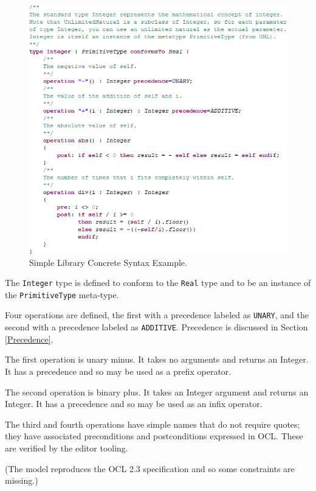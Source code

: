 \documentclass{eceasst}
\begin{document}
\begin{figure}
  \begin{center}
    \includegraphics[width=5.0in]{SimpleExample.png}
  \end{center}
  \caption{Simple Library Concrete Syntax Example.}
  \label{fig:SimpleExample}
\end{figure}

The \verb|Integer| type is defined to conform to the \verb|Real| type and to be an instance of the \verb|PrimitiveType| meta-type.

Four operations are defined, the first with a precedence labeled as \verb|UNARY|, and the second with a precedence labeled as \verb|ADDITIVE|. Precedence is discussed in Section \ref{Precedence}.

The first operation is unary minus. It takes no arguments and returns an Integer. It has a precedence and so may be used as a prefix operator.

The second operation is binary plus. It takes an Integer argument and returns an Integer. It has a precedence and so may be used as an infix operator.

The third and fourth operations have simple names that do not require quotes; they have associated preconditions and postconditions expressed in OCL. These are verified by the editor tooling.

(The model reproduces the OCL 2.3 specification and so some constraints are missing.) 
\end{document}

